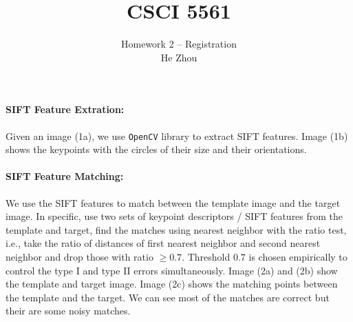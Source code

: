 \documentclass[11pt]{scrartcl}
\begin{document}
\title{CSCI 5561}
\author{\Large Homework 2 -- Registration\\
	He Zhou}  %
\maketitle

\newpage
\paragraph{\textbf{SIFT Feature Extration:}}
Given an image (1a), we use \texttt{OpenCV} library to extract SIFT features. Image (1b) shows the keypoints with the circles of their size and their orientations.


\begin{figure}[H]
	\captionsetup[subfigure]{labelformat=empty}
	\centering
	\label{fig:SIFT}
\end{figure}

\paragraph{\textbf{SIFT Feature Matching:}} 
We use the SIFT features to match between the template image and the target image. In specific, use two sets of keypoint descriptors / SIFT features from the template and target, find the matches using nearest neighbor with the ratio test, i.e., take the ratio of distances of first nearest neighbor and second nearest neighbor and drop those with ratio $\geq 0.7$. Threshold $0.7$ is chosen empirically to control the type I and type II errors simultaneously. Image (2a) and (2b) show the template and target image. Image (2c) shows the matching points between the template and the target. We can see most of the matches are correct but their are some noisy matches.
\end{document}
